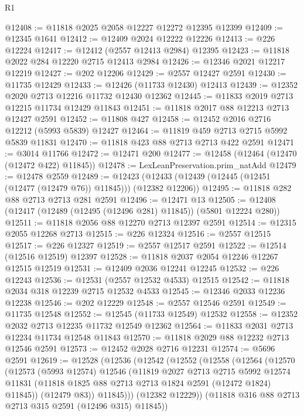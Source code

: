 \begin{lexlean}{R1}
\begin{coremodule}
@12408 := @11818 @2025 @2058 @12227 @12272 @12395 @12399
@12409 := @12345 @1641
@12412 := @12409 @2024 @12222 @12226
@12413 := @226 @12224
@12417 := @12412 (@2557 @12413 @2984) @12395
@12423 := @11818 @2022 @284 @12220 @2715 @12413 @2984
@12426 := @12346 @2021 @12217 @12219
@12427 := @202 @12206
@12429 := @2557 @12427 @2591
@12430 := @11735 @12429
@12433 := @12426 (@11733 @12430) @12413
@12439 := @12352 @2020 @2713 @12216 @11732 @12430 @12362
@12445 := @11833 @2019 @2713 @12215 @11734 @12429 @11843
@12451 := @11818 @2017 @88 @12213 @2713 @12427 @2591
@12452 := @11808 @427
@12458 := @12452 @2016 @2716 @12212 (@5993 @5839) @12427
@12464 := @11819 @459 @2713 @2715 @5992 @5839 @11831
@12470 := @11818 @423 @88 @2713 @2713 @422 @2591
@12471 := @3014 @11766
@12472 := @12471 @200
@12477 := @12458 (@12464 (@12470 (@12472 @422) @11845))
@12478 := LexLeanPreservation.prim_natAdd
@12479 := @12478 @2559
@12489 := @12423 (@12433 (@12439 (@12445 (@12451 (@12477 (@12479 @76)) @11845))) (@12382 @12206))
@12495 := @11818 @282 @88 @2713 @2713 @281 @2591
@12496 := @12471 @13
@12505 := @12408 (@12417 (@12489 (@12495 (@12496 @281) @11845)) (@5801 @12224 @280))
@12511 := @11818 @2056 @88 @12270 @2713 @12397 @2591
@12514 := @12315 @2055 @12268 @2713
@12515 := @226 @12324
@12516 := @2557 @12515
@12517 := @226 @12327
@12519 := @2557 @12517 @2591
@12522 := @12514 (@12516 @12519) @12397
@12528 := @11818 @2037 @2054 @12246 @12267 @12515 @12519
@12531 := @12409 @2036 @12241 @12245
@12532 := @226 @12243
@12536 := @12531 (@2557 @12532 @4533) @12515
@12542 := @11818 @2034 @318 @12239 @2715 @12532 @4533
@12545 := @12346 @2033 @12236 @12238
@12546 := @202 @12229
@12548 := @2557 @12546 @2591
@12549 := @11735 @12548
@12552 := @12545 (@11733 @12549) @12532
@12558 := @12352 @2032 @2713 @12235 @11732 @12549 @12362
@12564 := @11833 @2031 @2713 @12234 @11734 @12548 @11843
@12570 := @11818 @2029 @88 @12232 @2713 @12546 @2591
@12573 := @12452 @2028 @2716 @12231
@12574 := @5696 @2591
@12619 := @12528
    (@12536
      (@12542
        (@12552
          (@12558
            (@12564
              (@12570
                (@12573
                  (@5993 @12574)
                  @12546
                  (@11819
                    @2027
                    @2713
                    @2715
                    @5992
                    @12574
                    @11831
                    (@11818 @1825 @88 @2713 @2713 @1824 @2591 (@12472 @1824) @11845))
                  (@12479 @83))
                @11845)))
          (@12382 @12229))
        (@11818 @316 @88 @2713 @2713 @315 @2591 (@12496 @315) @11845))

\end{coremodule}
\end{lexlean}
